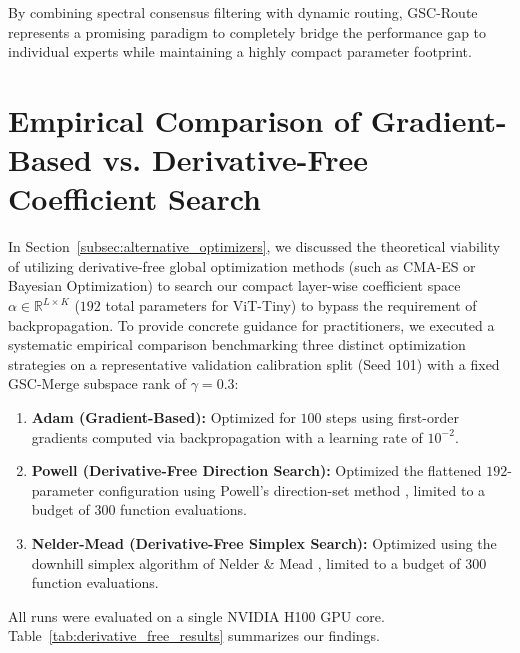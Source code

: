 \documentclass{article}
\theoremstyle{plain}
\theoremstyle{definition}
\theoremstyle{remark}
\begin{document}
By combining spectral consensus filtering with dynamic routing, GSC-Route represents a promising paradigm to completely bridge the performance gap to individual experts while maintaining a highly compact parameter footprint.

\section{Empirical Comparison of Gradient-Based vs. Derivative-Free Coefficient Search}
\label{appendix:derivative_free_study}

In Section~\ref{subsec:alternative_optimizers}, we discussed the theoretical viability of utilizing derivative-free global optimization methods (such as CMA-ES or Bayesian Optimization) to search our compact layer-wise coefficient space $\alpha \in \mathbb{R}^{L \times K}$ ($192$ total parameters for ViT-Tiny) to bypass the requirement of backpropagation. To provide concrete guidance for practitioners, we executed a systematic empirical comparison benchmarking three distinct optimization strategies on a representative validation calibration split (Seed 101) with a fixed GSC-Merge subspace rank of $\gamma = 0.3$:
\begin{enumerate}
    \item \textbf{Adam (Gradient-Based):} Optimized for $100$ steps using first-order gradients computed via backpropagation with a learning rate of $10^{-2}$.
    \item \textbf{Powell (Derivative-Free Direction Search):} Optimized the flattened $192$-parameter configuration using Powell's direction-set method \cite{powell1964efficient}, limited to a budget of $300$ function evaluations.
    \item \textbf{Nelder-Mead (Derivative-Free Simplex Search):} Optimized using the downhill simplex algorithm of Nelder \& Mead \cite{nelder1965simplex}, limited to a budget of $300$ function evaluations.
\end{enumerate}

All runs were evaluated on a single NVIDIA H100 GPU core. Table~\ref{tab:derivative_free_results} summarizes our findings.
\end{document}

